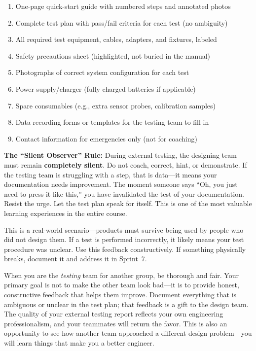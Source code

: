 \begin{checklistbox}
\begin{enumerate}[leftmargin=*, itemsep=1pt, topsep=0pt]
    \item One-page quick-start guide with numbered steps and annotated photos
    \item Complete test plan with pass/fail criteria for each test (no ambiguity)
    \item All required test equipment, cables, adapters, and fixtures, labeled
    \item Safety precautions sheet (highlighted, not buried in the manual)
    \item Photographs of correct system configuration for each test
    \item Power supply/charger (fully charged batteries if applicable)
    \item Spare consumables (e.g., extra sensor probes, calibration samples)
    \item Data recording forms or templates for the testing team to fill in
    \item Contact information for emergencies only (not for coaching)
\end{enumerate}
\end{checklistbox}

\begin{warnbox}
\textbf{The ``Silent Observer'' Rule:} During external testing, the designing team must remain \textbf{completely silent}. Do not coach, correct, hint, or demonstrate. If the testing team is struggling with a step, that is data---it means your documentation needs improvement. The moment someone says ``Oh, you just need to press it like this,'' you have invalidated the test of your documentation. Resist the urge. Let the test plan speak for itself. This is one of the most valuable learning experiences in the entire course.
\end{warnbox}

\begin{faqbox}
This is a real-world scenario---products must survive being used by people who did not design them. If a test is performed incorrectly, it likely means your test procedure was unclear. Use this feedback constructively. If something physically breaks, document it and address it in Sprint~7.
\end{faqbox}

\begin{protip}
When you are the \textit{testing} team for another group, be thorough and fair. Your primary goal is not to make the other team look bad---it is to provide honest, constructive feedback that helps them improve. Document everything that is ambiguous or unclear in the test plan; that feedback is a gift to the design team. The quality of your external testing report reflects your own engineering professionalism, and your teammates will return the favor. This is also an opportunity to see how another team approached a different design problem---you will learn things that make you a better engineer.
\end{protip}

